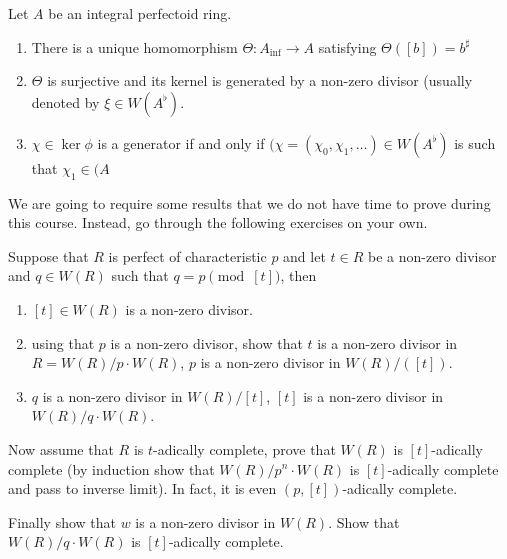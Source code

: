 \documentclass[a4paper]{article}
\newcommand{\tilt}{\flat} %
\begin{document}
\begin{theorem}[Fontaine]
  Let \(A\) be an integral perfectoid ring.
  \begin{enumerate}
  \item There is a unique homomorphism \(\Theta: A_{\mathrm{inf}} \to A\) satisfying \(\Theta([b]) = b^\sharp\)
  \item \(\Theta\) is surjective and its kernel is generated by a non-zero divisor (usually denoted by \(\xi \in W(A^\tilt)\).
  \item \(\chi \in \ker \phi\) is a generator if and only if \((\chi = (\chi_0, \chi_1, \dots) \in W(A^\tilt)\) is such that \(\chi_1 \in (A\)
  \end{enumerate}
\end{theorem}

We are going to require some results that we do not have time to prove during this course. Instead, go through the following exercises on your own.

\begin{ex}
  Suppose that \(R\) is perfect of characteristic \(p\) and let \(t \in R\) be a non-zero divisor and \(q \in W(R)\) such that \(q = p \pmod{[t]}\), then
  \begin{enumerate}
  \item \([t] \in W(R)\) is a non-zero divisor.
  \item using that \(p\) is a non-zero divisor, show that \(t\) is a non-zero divisor in \(R = W(R)/p \cdot W(R)\), \(p\) is a non-zero divisor in \(W(R)/([t])\).
  \item \(q\) is a non-zero divisor in \(W(R)/[t]\), \([t]\) is a non-zero divisor in \(W(R)/q \cdot W(R)\).
  \end{enumerate}

  Now assume that \(R\) is \(t\)-adically complete, prove that \(W(R)\) is \([t]\)-adically complete (by induction show that \(W(R)/p^n \cdot W(R)\) is \([t]\)-adically complete and pass to inverse limit). In fact, it is even \((p, [t])\)-adically complete.

  Finally show that \(w\) is a non-zero divisor in \(W(R)\). Show that \(W(R)/q \cdot W(R)\) is \([t]\)-adically complete.
\end{ex}
\end{document}
